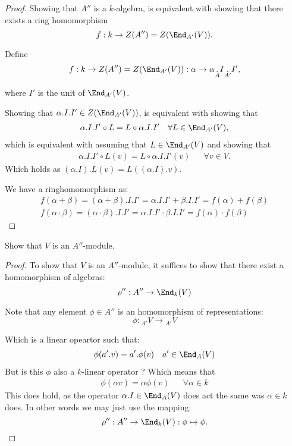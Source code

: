 \begin{proof}
Showing that \(A''\) is a \(k\)-algebra, is equivalent with showing that there exists a ring homomorphism
\[
f: k\rightarrow Z(A'')=Z(\End_{A'}(V)).
\]

Define
\[
f:k\rightarrow Z(A'')=Z(\End_{A'}(V)) : \alpha  \rightarrow  \alpha \underset{A}{.}I\underset{A'}{.}I',
\]

where \(I'\) is the unit of \(\End_{A'}(V)\).

Showing that \(\alpha .I.I'\in Z(\End_{A'}(V))\), is equivalent with showing that
\begin{align*}
\alpha .I.I'\circ L = L\circ \alpha .I.I' &&\forall L\in \End_{A'}(V),
\end{align*}
which is equivalent with assuming that \(L\in \End_{A'}(V)\) and showing that
\begin{align*}
\alpha .I.I'\circ L(v) = L\circ \alpha .I.I'(v) &&\forall v\in V.
\end{align*}
Which holds as \((\alpha .I).L(v)=L((\alpha .I).v)\).

We have a ringhomomorphism as:
\begin{gather*}
f(\alpha +\beta )=(\alpha +\beta ).I.I'=\alpha .I.I'+\beta .I.I'=f(\alpha )+f(\beta ) \\
f(\alpha \cdot \beta )=(\alpha \cdot \beta ).I.I'=\alpha .I.I'\cdot \beta .I.I'=f(\alpha )\cdot f(\beta ) 
\end{gather*}
\end{proof}

\newpage
\begin{prop}
Show that \(V\) is an \(A''\)-module.
\end{prop}

\begin{proof}
To show that \(V\) is an \(A''\)-module, it suffices to show that there exist a homomorphism of algebras:
\[
\rho '' : A'' \rightarrow  \End_{k}(V)
\]

Note that any element \(\phi \in A''\) is an homomorphism of representations:
\[
\phi : {_{A'}}V\rightarrow  {_{A'}}V
\]

Which is a linear opeartor such that:
\begin{align*}
\phi (a'.v)=a'.\phi (v) &&a'\in \End_A(V)
\end{align*}
But is this \(\phi \) also a \(k\)-linear operator ? Which means that
\begin{align*}
\phi (\alpha v)=\alpha \phi (v) &&\forall \alpha \in k
\end{align*}
This does hold, as the operator \(\alpha .I\in \End_A(V)\) does act the same was \(\alpha \in k\) does.
In other words we may just use the mapping:
\[
\rho '' : A'' \rightarrow  \End_{k}(V): \phi  \mapsto \phi .
\]
\end{proof}


